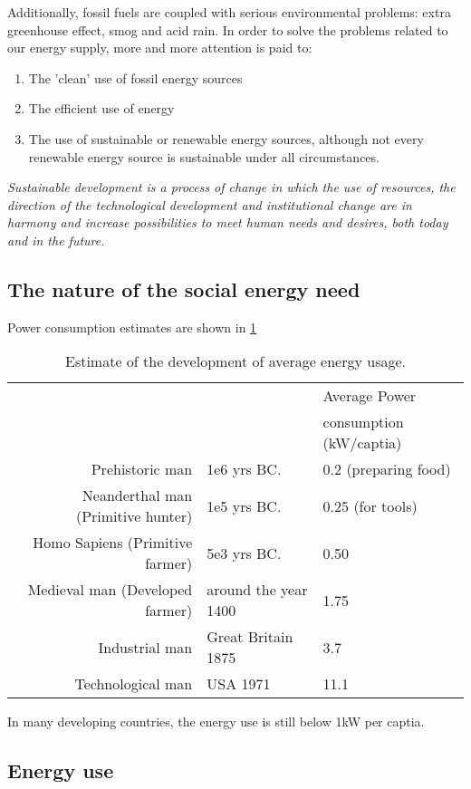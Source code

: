 \documentclass[a4paper,10pt]{article}
\begin{document}
Additionally, fossil fuels are coupled with serious environmental problems: extra greenhouse effect, smog and acid rain.  In order to solve the problems related to our energy supply, more and more attention is paid to:
\begin{enumerate}
 \item The 'clean' use of fossil energy sources 
 \item The efficient use of energy
 \item The use of sustainable or renewable energy sources, although not every renewable energy source is sustainable under all circumstances.
\end{enumerate}

\emph{Sustainable development is a process of change in which the use of resources, the direction of the technological development and institutional change are in harmony and increase possibilities to meet human needs and desires, both today and in the future.}

\subsection{The nature of the social energy need}

Power consumption estimates are shown in \cref{tab:pc}

\begin{table}[ht]
  \begin{tabular}{rll}
   && Average Power \\
   && consumption (kW/captia) \\ \hline
   Prehistoric man & 1e6 yrs BC.  & 0.2 (preparing food)\\
   Neanderthal man (Primitive hunter) & 1e5 yrs BC. & 0.25 (for tools)\\
   Homo Sapiens (Primitive farmer) & 5e3 yrs BC. & 0.50 \\
   Medieval man (Developed farmer) & around the year 1400 & 1.75 \\
   Industrial man & Great Britain 1875 & 3.7 \\
   Technological man & USA 1971 & 11.1
  \end{tabular}
\caption{Estimate of the development of average energy usage.}
\label{tab:pc}
\end{table}

In many developing countries, the energy use is still below 1kW per captia.

\subsection{Energy use}
\end{document}
